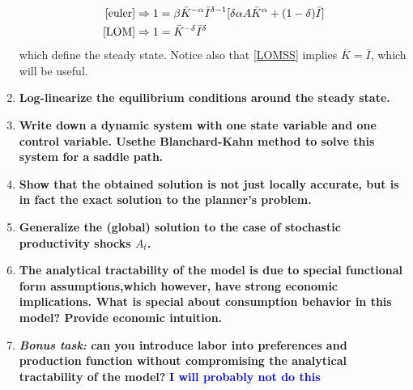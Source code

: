 \documentclass[]{article}
\newcommand{\fix} [1] {\textbf{\textcolor{blue}{#1}}} %
\begin{document}
\begin{enumerate}
\begin{align}
\eqref{euler} & \Rightarrow 1 = \beta \bar{K}^{-\alpha}\bar{I}^{\delta-1}[\delta\alpha A \bar{K}^\alpha + (1-\delta)\bar{I} ]
\label {eulerSS}\\
\eqref{LOM} & \Rightarrow 1 = \bar{K}^{-\delta}\bar{I}^\delta \label{LOMSS}
\end{align}
which define the steady state. Notice also that \eqref{LOMSS} implies $\bar{K} = \bar{I}$, which will be useful. 


\item \textbf{Log-linearize the equilibrium conditions around the steady state.} 


\item \textbf{Write down a dynamic system with one state variable and one control variable. Usethe Blanchard-Kahn method to solve this system for a saddle path.}


\item \textbf{Show that the obtained solution is not just locally accurate, but is in fact the exact solution to the planner’s problem.}


\item \textbf{Generalize the (global) solution to the case of stochastic productivity shocks $A_t$.}


\item \textbf{The analytical tractability of the model is due to special functional form assumptions,which however, have strong economic implications. What is special about consumption behavior in this model? Provide economic intuition.}


\item \textbf{\textit{Bonus task:} can you introduce labor into preferences and production function without compromising the analytical tractability of the model?}
\fix{I will probably not do this} 

\end{enumerate} %
\end{document}

